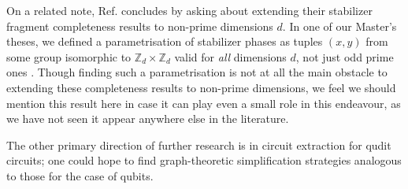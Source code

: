 On a related note, Ref. \cite{Booth_2022} concludes by asking about extending their stabilizer fragment completeness results to non-prime dimensions $d$. In one of our Master's theses, we defined a parametrisation of stabilizer phases as tuples $(x, y)$ from some group isomorphic to $\mathbb{Z}_d \times \mathbb{Z}_d$ valid for \emph{all} dimensions $d$, not just odd prime ones \cite[Theorem 5.2]{TeagueMasters}. Though finding such a parametrisation is not at all the main obstacle to extending these completeness results to non-prime dimensions, we feel we should mention this result here in case it can play even a small role in this endeavour, as we have not seen it appear anywhere else in the literature.

The other primary direction of further research is in circuit extraction \cite{backens2020again} for qudit circuits; one could hope to find graph-theoretic simplification \cite{graph_theoretic_simplification} strategies analogous to those for the case of qubits.

